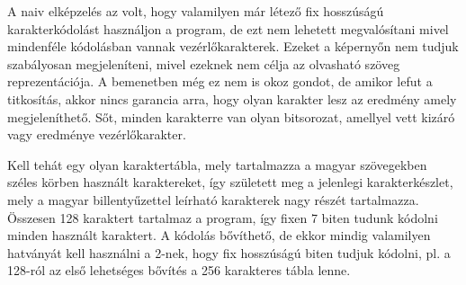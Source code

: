 \documentclass[hidelinks, 12pt]{article}
\begin{document}
	A naiv elképzelés az volt, hogy valamilyen már létező fix hosszúságú karakterkódolást használjon a program, de ezt nem lehetett megvalósítani mivel mindenféle kódolásban vannak vezérlőkarakterek. Ezeket a képernyőn nem tudjuk szabályosan megjeleníteni, mivel ezeknek nem célja az olvasható szöveg reprezentációja. A bemenetben még ez nem is okoz gondot, de amikor lefut a titkosítás, akkor nincs garancia arra, hogy olyan karakter lesz az eredmény amely megjeleníthető. Sőt, minden karakterre van olyan bitsorozat, amellyel vett kizáró vagy eredménye vezérlőkarakter.
	
	Kell tehát egy olyan karaktertábla, mely tartalmazza a magyar szövegekben széles körben használt karaktereket, így született meg a jelenlegi karakterkészlet, mely a magyar billentyűzettel leírható karakterek nagy részét tartalmazza. Összesen 128 karaktert tartalmaz a program, így fixen 7 biten tudunk kódolni minden használt karaktert. A kódolás bővíthető, de ekkor mindig valamilyen hatványát kell használni a 2-nek, hogy fix hosszúságú biten tudjuk kódolni, pl. a 128-ról az első lehetséges bővítés a 256 karakteres tábla lenne.
	
\end{document}
